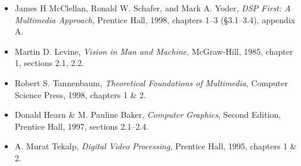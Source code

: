 \begin{itemize}
\item James H McClellan, Ronald W. Schafer, and Mark A. Yoder,
  \textit{DSP First: A Multimedia Approach}, Prentice Hall, 1998,
  chapters 1--3 (\S 3.1--3.4), appendix A.
\item Martin D. Levine, \textit{Vision in Man and Machine},
  McGraw-Hill, 1985, chapter 1, sections 2.1, 2.2.
\item Robert S. Tannenbaum, \textit{Theoretical Foundations of
  Multimedia}, Computer Science Press, 1998, chapters 1 \& 2.
\item Donald Hearn \& M. Pauline Baker, \textit{Computer Graphics},
  Second Edition, Prentice Hall, 1997, sections 2.1--2.4.
\item A. Murat Tekalp, \textit{Digital Video Processing}, Prentice
  Hall, 1995, chapters 1 \& 2. 
\end{itemize}


